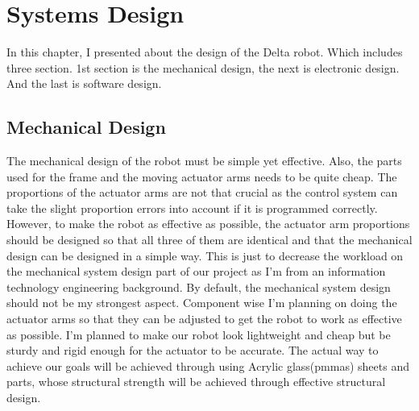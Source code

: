 \chapter{Systems Design}

In this chapter, I presented about the design of the Delta robot. Which includes three section. 1st section is the mechanical design, the next is electronic design. And the last is software design.

\section{Mechanical Design}
The mechanical design of the robot must be simple yet effective. Also, the parts used for the frame and the moving actuator arms needs to be quite cheap. The proportions of the actuator arms are not that crucial as the control system can take the slight proportion errors into account if it is programmed correctly. However, to make the robot as effective as possible, the actuator arm proportions should be designed so that all three of them are identical and that the mechanical design can be designed in a simple way. This is just to decrease the workload on the mechanical system design part of our project as I'm from an information technology engineering background. By default, the mechanical system design should not be my strongest aspect. Component wise I'm planning on doing the actuator arms so that they can be adjusted to get the robot to work as effective as possible. I'm planned to make our robot look lightweight and cheap but be sturdy and rigid enough for the actuator to be  accurate. The actual way to achieve our goals will be achieved through using Acrylic glass(\glspl{pmma}) sheets and parts, whose structural strength will be achieved through effective structural design.

